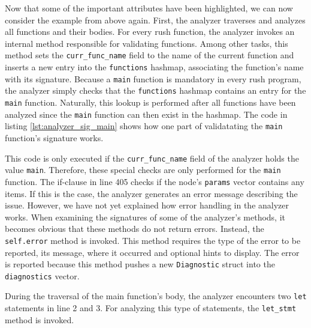 Now that some of the important attributes have been highlighted, we can now consider the example from above again.
First, the analyzer traverses and analyzes all functions and their bodies.
For every rush function, the analyzer invokes an internal method responsible for validating functions.
Among other tasks, this method sets the \texttt{curr\_func\_name} field to the name of the current function and
inserts a new entry into the \texttt{functions} hashmap, associating the function's name with its signature.
Because a \texttt{main} function is mandatory in every rush program,
the analyzer simply checks that the \texttt{functions} hashmap contains an entry for the \texttt{main} function.
Naturally, this lookup is performed after all functions have been analyzed since the \texttt{main} function can then exist in the hashmap.
The code in listing \ref{lst:analyzer_sig_main} shows how one part of validatating the \texttt{main} function's signature works.


This code is only executed if the \texttt{curr\_func\_name} field of the analyzer holds the value \texttt{main}.
Therefore, these special checks are only performed for the \texttt{main} function.
The if-clause in line 405 checks if the node's \texttt{params} vector contains any items.
If this is the case, the analyzer generates an error message describing the issue.
However, we have not yet explained how error handling in the analyzer works.
When examining the signatures of some of the analyzer's methods, it becomes obvious that these methods do not return errors.
Instead, the \texttt{self.error} method is invoked.
This method requires the type of the error to be reported, its message, where it occurred and optional hints to display.
The error is reported because this method pushes a new \texttt{Diagnostic} struct into the \texttt{diagnostics} vector.

During the traversal of the main function's body, the analyzer encounters two \texttt{let} statements in line 2 and 3.
For analyzing this type of statements, the \texttt{let\_stmt} method is invoked.


